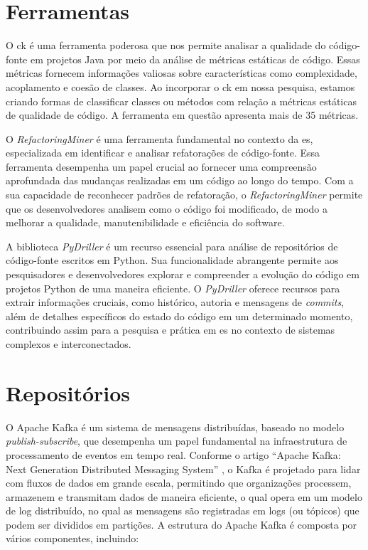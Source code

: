 \section{Ferramentas}\label{sec:ferramentas}
O \gls{ck} \cite{aniche-ck} é uma ferramenta poderosa que nos permite analisar a qualidade do código-fonte em projetos Java por meio da análise de métricas estáticas de código. Essas métricas fornecem informações valiosas sobre características como complexidade, acoplamento e coesão de classes. Ao incorporar o \gls{ck} em nossa pesquisa, estamos criando formas de classificar classes ou métodos com relação a métricas estáticas de qualidade de código. A ferramenta em questão apresenta mais de 35 métricas.

O \textit{RefactoringMiner} \cite{Tsantalis:ICSE:2018:RefactoringMiner} é uma ferramenta fundamental no contexto da \gls{es}, especializada em identificar e analisar refatorações de código-fonte. Essa ferramenta desempenha um papel crucial ao fornecer uma compreensão aprofundada das mudanças realizadas em um código ao longo do tempo. Com a sua capacidade de reconhecer padrões de refatoração, o \textit{RefactoringMiner} permite que os desenvolvedores analisem como o código foi modificado, de modo a melhorar a qualidade, manutenibilidade e eficiência do software.

A biblioteca \textit{PyDriller} \cite{PyDrillerSpadini2018} é um recurso essencial para análise de repositórios de código-fonte escritos em Python. Sua funcionalidade abrangente permite aos pesquisadores e desenvolvedores explorar e compreender a evolução do código em projetos Python de uma maneira eficiente. O \textit{PyDriller} oferece recursos para extrair informações cruciais, como histórico, autoria e mensagens de \textit{commits}, além de detalhes específicos do estado do código em um determinado momento, contribuindo assim para a pesquisa e prática em \gls{es} no contexto de sistemas complexos e interconectados.

\section{Repositórios}\label{sec:repositorios}

O Apache Kafka \cite{KafkaGitHub} é um sistema de mensagens distribuídas, baseado no modelo \textit{publish-subscribe}, que desempenha um papel fundamental na infraestrutura de processamento de eventos em tempo real. Conforme o artigo ``Apache Kafka: Next Generation Distributed Messaging System'' \cite{ApacheKafkaNextGenerationDistributedMessagingSystem:2010}, o Kafka é projetado para lidar com fluxos de dados em grande escala, permitindo que organizações processem, armazenem e transmitam dados de maneira eficiente, o qual opera em um modelo de log distribuído, no qual as mensagens são registradas em logs (ou tópicos) que podem ser divididos em partições. 
A estrutura do Apache Kafka é composta por vários componentes, incluindo:


